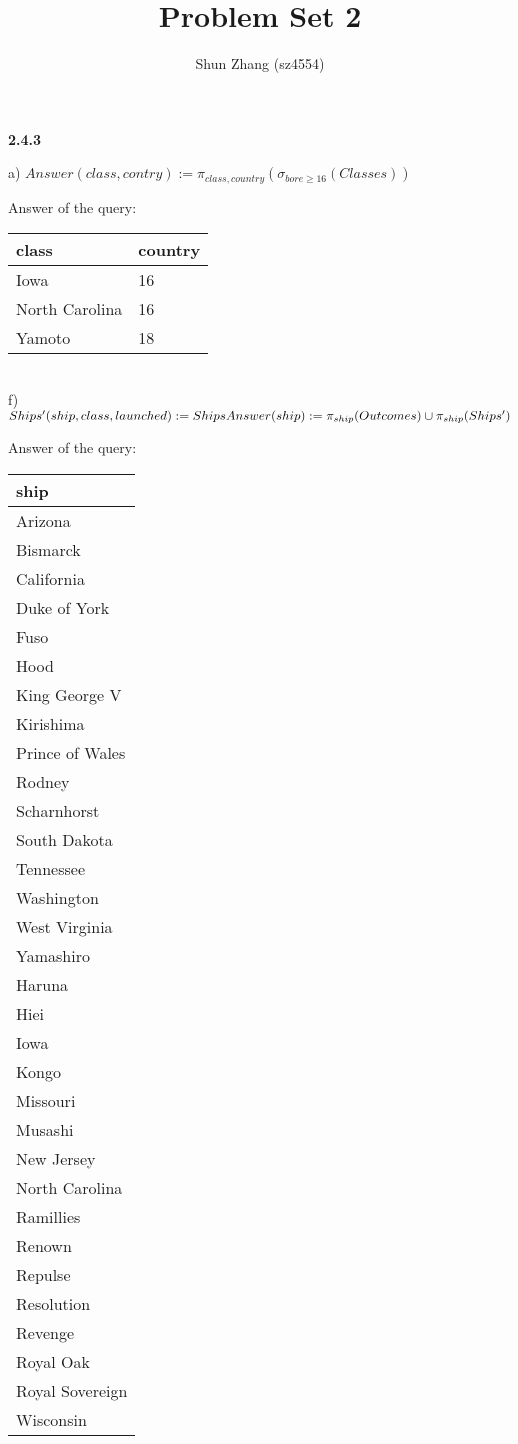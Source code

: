 \documentclass[12pt]{article}
\title{Problem Set 2}
\author{Shun Zhang (sz4554)}
\begin{document}
\maketitle

\textbf{2.4.3}

a) $Answer(class,contry) := \pi_{class,country}(\sigma_{bore\geq 16}(Classes))$

Answer of the query:

\begin{tabular}{l|l}
	class & country \\
	\hline \hline
	Iowa & 16 \\
	North Carolina & 16 \\
	Yamoto & 18
\end{tabular}\\

f) $Ships'(ship, class, launched) := Ships\\
Answer(ship) := \pi_{ship}(Outcomes) \cup \pi_{ship}(Ships')$

Answer of the query:

\begin{tabular}{l}
	ship \\
	\hline \hline	
	Arizona\\
	Bismarck\\
	California\\
	Duke of York\\
	Fuso\\
	Hood\\
	King George V\\
	Kirishima\\
	Prince of Wales\\
	Rodney\\
	Scharnhorst\\
	South Dakota\\
	Tennessee\\
	Washington\\
	West Virginia\\
	Yamashiro\\
	Haruna\\
	Hiei\\
	Iowa\\
	Kongo\\
	Missouri\\
	Musashi\\
	New Jersey\\
	North Carolina\\
	Ramillies\\
	Renown\\
	Repulse\\
	Resolution\\
	Revenge\\
	Royal Oak\\
	Royal Sovereign\\
	Wisconsin
\end{tabular}\\
\end{document}

